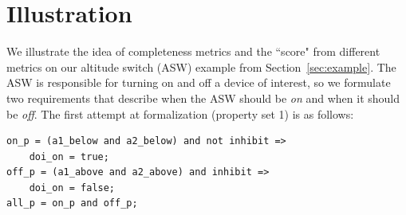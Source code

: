 \section{Illustration}
\label{sec:illust}

\newcommand{\allp}{\texttt{all\_p}}
\newcommand{\onp}{\texttt{on\_p}}
\newcommand{\offp}{\texttt{off\_p}}
\newcommand{\hystp}{\texttt{hyst\_p}}
\newcommand{\aonebelow}{\texttt{a1\_below}}
\newcommand{\atwobelow}{\texttt{a2\_below}}
\newcommand{\aoneabove}{\texttt{a1\_above}}
\newcommand{\atwoabove}{\texttt{a2\_above}}
\newcommand{\doion}{\texttt{doi\_on}}
\newcommand{\done}{\texttt{d1}}
\newcommand{\dtwo}{\texttt{d2}}
\newcommand{\abovehyst}{\texttt{above\_hyst}}
\newcommand{\inhibit}{\texttt{inhibit}}

We illustrate the idea of completeness metrics and the ``score" from different metrics on our altitude switch (ASW) example from Section~\ref{sec:example}.  %
%
The ASW is responsible for turning on and off a device of interest, so we formulate two requirements that describe when the ASW should be {\em on} and when it should be {\em off}.  %
%
The first attempt at formalization (property set 1) is as follows:

{\smaller
\begin{verbatim}
on_p = (a1_below and a2_below) and not inhibit =>
    doi_on = true;
off_p = (a1_above and a2_above) and inhibit =>
    doi_on = false;
all_p = on_p and off_p;
\end{verbatim}
}

